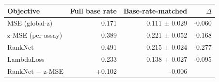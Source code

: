\begin{tabular}{lrrr}
\toprule
Objective & Full base rate & Base-rate-matched & $\Delta$ \\
\midrule
MSE (global-z) & 0.171 & 0.111 $\pm$ 0.029 & -0.060 \\
z-MSE (per-assay) & 0.389 & 0.221 $\pm$ 0.052 & -0.168 \\
RankNet & 0.491 & 0.215 $\pm$ 0.024 & -0.277 \\
LambdaLoss & 0.233 & 0.138 $\pm$ 0.027 & -0.095 \\
\midrule
RankNet $-$ z-MSE & +0.102 & -0.006 & \\
\bottomrule
\end{tabular}
